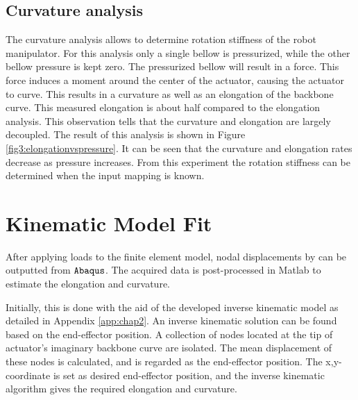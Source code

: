\subsection{Curvature analysis}

The curvature analysis allows to determine rotation stiffness of the robot manipulator. For this analysis only a single bellow is pressurized, while the other bellow pressure is kept zero. The pressurized bellow will result in a force. This force induces a moment around the center of the actuator, causing the actuator to curve. This results in a curvature as well as an elongation of the backbone curve. This measured elongation is about half compared to the elongation analysis. This observation tells that the curvature and elongation are largely decoupled. The result of this analysis is shown in Figure \ref{fig3:elongationvspressure}. It can be seen that the curvature and elongation rates decrease as pressure increases. From this experiment the rotation stiffness can be determined when the input mapping is known.  











\newpage


\section{Kinematic Model Fit}
\label{sec3:KinematicModelFit}

After applying loads to the finite element model, nodal displacements by can be outputted from $\verb+Abaqus+$. The acquired data is post-processed in Matlab to estimate the elongation and curvature. 

Initially, this is done with the aid of the developed inverse kinematic model as detailed in Appendix \ref{app:chap2}. An inverse kinematic solution can be found based on the end-effector position. A collection of nodes located at the tip of actuator's imaginary backbone curve are isolated. The mean displacement of these nodes is calculated, and is regarded as the end-effector position. The x,y-coordinate is set as desired end-effector position, and the inverse kinematic algorithm gives the required elongation and curvature. 


